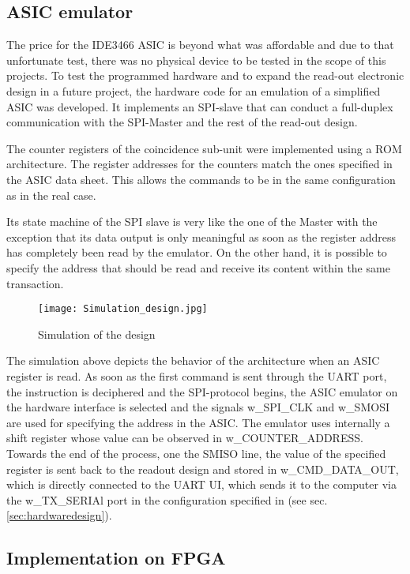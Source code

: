 \subsection{ASIC emulator}
The price for the IDE3466 ASIC is beyond what was affordable and due to that unfortunate test, there was no physical device to be tested in the scope of this projects. To test the programmed hardware and to expand the read-out electronic design in a future project, the hardware code for an emulation of a simplified ASIC was developed. It implements an SPI-slave that can conduct a full-duplex communication with the SPI-Master and the rest of the read-out design. 
\newline 

The counter registers of the coincidence sub-unit were implemented using a ROM architecture. The register addresses for the counters match the ones specified in the ASIC data sheet. This allows the commands to be in the same configuration as in the real case. 
\newline

Its state machine of the SPI slave is very like the one of the Master with the exception that its data output is only meaningful as soon as the register address has completely been read by the emulator. On the other hand, it is possible to specify the address that should be read and receive its content within the same transaction. 


\begin{figure}[H]
    \centering
    \texttt{[image: Simulation\_design.jpg]}
    \caption[]{Simulation of the design}
    \label{fig:Simulation}
\end{figure}

The simulation above depicts the behavior of the architecture when an ASIC register is read. As soon as the first command is sent through the UART port, the instruction is deciphered and the SPI-protocol begins, the ASIC emulator on the hardware interface is selected and the signals w\_SPI\_CLK and w\_SMOSI are used for specifying the address in the ASIC. The emulator uses internally a shift register whose value can be observed in w\_COUNTER\_ADDRESS. Towards the end of the process, one the SMISO line, the value of the specified register is sent back to the readout design and stored in w\_CMD\_DATA\_OUT, which is directly connected to the UART UI, which sends it to the computer via the w\_TX\_SERIAl port in the configuration specified in (see sec. \ref{sec:hardwaredesign}).

\subsection{Implementation on FPGA}

